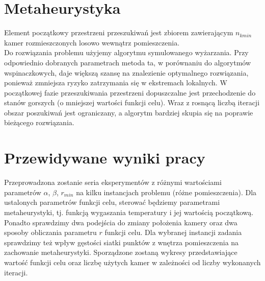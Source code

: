 \documentclass[12pt,a4paper]{article}
\begin{document}
\section{Metaheurystyka}
Element początkowy przestrzeni przeszukiwań jest zbiorem zawierającym $n_{kmin}$ kamer rozmieszczonych losowo wewnątrz pomieszczenia.\\
Do rozwiązania problemu użyjemy algorytmu symulowanego wyżarzania. Przy odpowiednio dobranych parametrach metoda ta, w porównaniu do algorytmów wspinaczkowych, daje większą szansę na znalezienie optymalnego rozwiązania, ponieważ zmniejsza ryzyko zatrzymania się w ekstremach lokalnych. W początkowej fazie przeszukiwania przestrzeni dopuszczalne jest przechodzenie do stanów gorszych (o mniejszej wartości funkcji celu). Wraz z rosnącą liczbą iteracji obszar poszukiwań jest ograniczany, a algorytm bardziej skupia się na poprawie bieżącego rozwiązania.

\section{Przewidywane wyniki pracy}
Przeprowadzona zostanie seria eksperymentów z różnymi wartościami parametrów $\alpha$, $\beta$, $r_{min}$ na kilku instancjach problemu (różne pomieszczenia). Dla ustalonych parametrów funkcji celu, sterować będziemy parametrami metaheurystyki, tj. funkcją wygaszania temperatury i jej
wartością początkową. Ponadto sprawdzimy dwa podejścia do zmiany położenia kamery oraz dwa sposoby obliczania parametru $r$ funkcji celu. Dla wybranej
instancji zadania sprawdzimy też wpływ gęstości siatki punktów z wnętrza
pomieszczenia na zachowanie metaheurystyki. Sporządzone zostaną wykresy przedstawiające wartość funkcji celu oraz liczbę użytych kamer w zależności od liczby wykonanych iteracji. 
\end{document}
